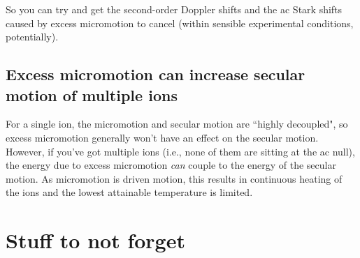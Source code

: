 \documentclass{article}
\begin{document}
So you can try and get the second-order Doppler shifts and the ac Stark shifts caused by excess micromotion to cancel (within sensible experimental conditions, potentially).


\subsection*{Excess micromotion can increase secular motion of multiple ions}

For a single ion, the micromotion and secular motion are ``highly decoupled", so excess micromotion generally won't have an effect on the secular motion. However, if you've got multiple ions (i.e., none of them are sitting at the ac null), the energy due to excess micromotion \textit{can} couple to the energy of the secular motion. As micromotion is driven motion, this results in continuous heating of the ions and the lowest attainable temperature is limited.



\newpage

\section{Stuff to not forget}
\end{document}
